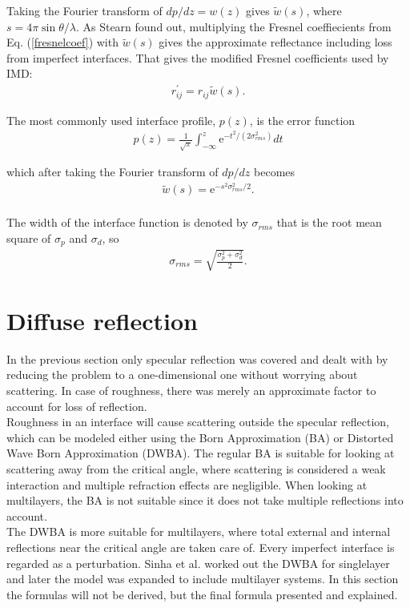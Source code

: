 Taking the Fourier transform of $dp/dz=w(z)$ gives $\tilde{w}(s)$, where $s = 4 \pi \sin{\theta}/\lambda$. As Stearn found out, multiplying the Fresnel coeffiecients from Eq. (\ref{fresnelcoef}) with $\tilde{w}(s)$ gives the approximate reflectance including loss from imperfect interfaces. That gives the modified Fresnel coefficients used by IMD:
\begin{eqnarray}
	r_{ij}^{'} = r_{ij} \tilde{w}(s).
\end{eqnarray}

The most commonly used interface profile, $p(z)$, is the error function
\begin{eqnarray}
	p(z) = \frac{1}{\sqrt{\pi}}\int_{-\infty}^z \mathrm{e}^{-t^2/(2\sigma_{rms}^{2})}dt
\end{eqnarray}

which after taking the Fourier transform of $dp/dz$ becomes
\begin{eqnarray}\label{interfacefunction}
	\tilde{w}(s) = \mathrm{e}^{-s^2\sigma_{rms}^2/2}.
\end{eqnarray}\\

The width of the interface function is denoted by $\sigma_{rms}$ that is the root mean square of $\sigma_p$ and $\sigma_d$, so
\begin{eqnarray}
	\sigma_{rms} = \sqrt{\frac{\sigma_p^2 + \sigma_d^2}{2}}.
\end{eqnarray}

\section{Diffuse reflection}\label{diffuserefl}
In the previous section only specular reflection was covered and dealt with by reducing the problem to a one-dimensional one without worrying about scattering. In case of roughness, there was merely an approximate factor to account for loss of reflection.\\
Roughness in an interface will cause scattering outside the specular reflection, which can be modeled either using the Born Approximation (BA) or Distorted Wave Born Approximation (DWBA)\cite{Sinha:1988p5102}. The regular BA is suitable for looking at scattering away from the critical angle, where scattering is considered a weak interaction and multiple refraction effects are negligible. When looking at multilayers, the BA is not suitable since it does not take multiple reflections into account.\\
The DWBA is more suitable for multilayers, where total external and internal reflections near the critical angle are taken care of. Every imperfect interface is regarded as a perturbation. Sinha et al.\cite{Sinha:1988p5102} worked out the DWBA for singlelayer and later the model was expanded to include multilayer systems\cite{Stearns:1998p5375,Kopecky:1995p5468,Holy:1993p5469}. In this section the formulas will not be derived, but the final formula presented and explained.\\

